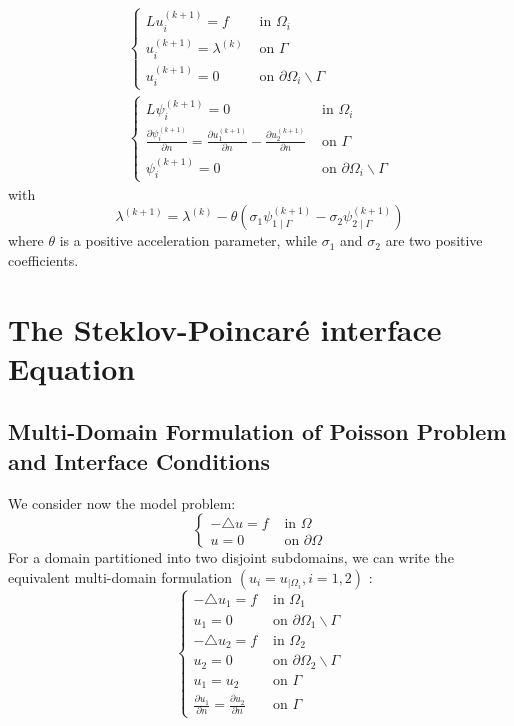 \documentclass[11pt]{book}
\begin{document}
$$
\begin{gathered}
\begin{cases}L u_{i}^{(k+1)}=f & \text { in } \Omega_{i} \\
u_{i}^{(k+1)}=\lambda^{(k)} & \text { on } \Gamma \\
u_{i}^{(k+1)}=0 & \text { on } \partial \Omega_{i} \backslash \Gamma\end{cases} \\
\begin{cases}L \psi_{i}^{(k+1)}=0 & \text { in } \Omega_{i} \\
\frac{\partial \psi_{i}^{(k+1)}}{\partial n}=\frac{\partial u_{1}^{(k+1)}}{\partial n}-\frac{\partial u_{2}^{(k+1)}}{\partial n} & \text { on } \Gamma \\
\psi_{i}^{(k+1)}=0 & \text { on } \partial \Omega_{i} \backslash \Gamma\end{cases}
\end{gathered}
$$
with
$$
\lambda^{(k+1)}=\lambda^{(k)}-\theta\left(\sigma_{1} \psi_{1 \mid \Gamma}^{(k+1)}-\sigma_{2} \psi_{2 \mid \Gamma}^{(k+1)}\right)
$$
where $\theta$ is a positive acceleration parameter, while $\sigma_{1}$ and $\sigma_{2}$ are two positive coefficients.



\section{The Steklov-Poincaré interface Equation}
\subsection*{Multi-Domain Formulation of Poisson Problem and Interface Conditions}
We consider now the model problem:
$$
\begin{cases}-\triangle u=f & \text { in } \Omega \\ u=0 & \text { on } \partial \Omega\end{cases}
$$
For a domain partitioned into two disjoint subdomains, we can write the equivalent multi-domain formulation $\left(u_{i}=u_{\mid \Omega_{i}}, i=1,2\right)$ :
$$
\begin{cases}-\triangle u_{1}=f & \text { in } \Omega_{1} \\ u_{1}=0 & \text { on } \partial \Omega_{1} \backslash \Gamma \\ -\triangle u_{2}=f & \text { in } \Omega_{2} \\ u_{2}=0 & \text { on } \partial \Omega_{2} \backslash \Gamma \\ u_{1}=u_{2} & \text { on } \Gamma \\ \frac{\partial u_{1}}{\partial n}=\frac{\partial u_{2}}{\partial n} & \text { on } \Gamma\end{cases}
$$
\end{document}
